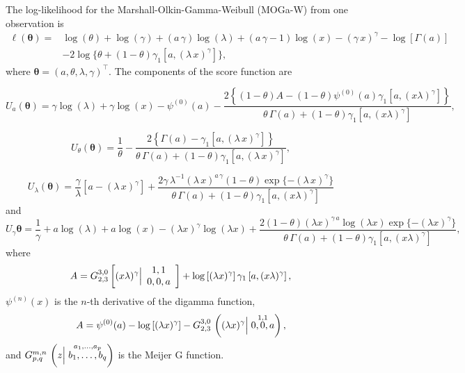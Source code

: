 \documentclass[twoside,leqno,11pt]{article}
\begin{document}
The log-likelihood for the Marshall-Olkin-Gamma-Weibull (MOGa-W) from one observation is
\begin{align}
\ell (\boldsymbol{\theta})=& \log (\theta)+\log (\gamma)+(a\,\gamma)\log (\lambda)+(a\,\gamma-1)\log(x)-(\gamma\, x)^\gamma-\log[\Gamma(a)]\nonumber \\ &-2\log\{\theta+(1-\theta)\gamma_1[a,(\lambda\,x)^\gamma]\},
\end{align}
where $\boldsymbol{\theta}=(a,\theta,\lambda,\gamma)^\top$. The components of the score function are

\begin{equation*}
U_{a}(\boldsymbol{\theta})=\gamma  \log (\lambda )+\gamma  \log (x)-\psi ^{(0)}(a)-\frac{2\left\{(1-\theta ) A-(1-\theta ) \psi ^{(0)}(a) \gamma_1 \left[a,(x \lambda
   )^{\gamma }\right]\right\}}{\theta\,\Gamma(a)+(1-\theta)\gamma_1\left[a,(x \lambda
   )^{\gamma }\right]},
\end{equation*}

\begin{equation*}
U_{\theta}(\boldsymbol{\theta})=\frac{1}{\theta}-\frac{2\left\{\Gamma(a)-\gamma_1\left[a,(\lambda\,x)^\gamma\right]\right\}}{\theta\,\Gamma(a)+(1-\theta)\gamma_1\left[a,(\lambda\,x)^\gamma\right]},
\end{equation*}

\begin{equation*}
U_{\lambda}(\boldsymbol{\theta})=\frac{\gamma }{\lambda }\left[a-(\lambda\,x)^\gamma\right]+\frac{2 \gamma \,\lambda^{-1}(\lambda\,x)^{a\,\gamma} (1-\theta )\exp\{-(\lambda\,x)^\gamma\} }{\theta \,\Gamma(a)+(1-\theta )
   \gamma_1 \left[a,(x \lambda )^{\gamma }\right]}
\end{equation*}
and
\begin{equation*}		
U_{\gamma}\boldsymbol{\theta}=\frac{1}{\gamma }+a \log (\lambda )+a \log (x)-(\lambda  x)^{\gamma } \log
   (\lambda  x)+\frac{2 (1-\theta )(\lambda
   x)^{\gamma\,a } \log (\lambda  x)\exp\{-(\lambda  x)^{\gamma }\}  }{\theta \,\Gamma(a)+(1-\theta )
   \gamma_1 \left[a,(x \lambda )^{\gamma }\right]},
\end{equation*}
where
\begin{align*}
A=G_{2,3}^{3,0}\left[(x \lambda )^{\gamma }\Big{|}
\begin{array}{c}
 1,1 \\
 0,0,a \\
\end{array}
\right]+\log \left[(\lambda  x)^{\gamma }\right] \gamma_1 \left[a,(x \lambda )^{\gamma
   }\right],
\end{align*}
$\psi^{(n)}(x)$ is the $n$-th derivative of the digamma function,
\begin{eqnarray*}
A=\psi^{(0)}(a) - \log\left[(\lambda x)^{\gamma}\right]-G^{3,0}_{2,3}\,\left((\lambda x)^{\gamma} \Big{|}	\stackrel{1,1}{0,0,a}\right),
\end{eqnarray*}
and $G^{m,n}_{p,q}\,\left(z \Big{|}	\stackrel{a_{1},\ldots,a_{p}}{b_{1},\ldots,b_{q}}\right)$ is the Meijer G function.
\end{document}
